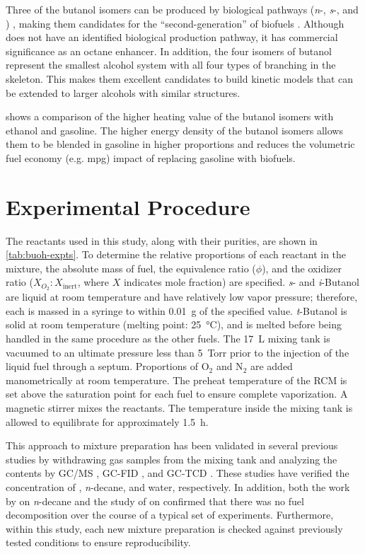 \documentclass[../main.tex]{subfiles}
\begin{document}
Three of the butanol isomers can be produced
by biological pathways (\textit{n}-, \textit{s}-, and \iBuOH{})
\cite{Nigam2011,Smith2010}, making them candidates for the ``second-generation''
of biofuels \cite{Harvey2011,Nigam2011}. Although \tBuOH{} does not have
an identified biological production pathway, it has commercial significance
as an octane enhancer. In addition, the four isomers of butanol represent
the smallest alcohol system with all four types of branching in the skeleton.
This makes them excellent candidates to build kinetic models that can be
extended to larger alcohols with similar structures.

 shows a comparison of the higher heating value of
the butanol isomers with ethanol and gasoline. The higher energy density
of the butanol isomers allows them to be blended in gasoline in higher
proportions and reduces the volumetric fuel economy (e.g. mpg) impact
of replacing gasoline with biofuels.

\section{Experimental Procedure}
\label{sec:buoh-proc}

The reactants used in this study, along with their purities, are shown in
\cref{tab:buoh-expts}. To determine the relative proportions of each
reactant in the mixture, the absolute mass of fuel, the equivalence ratio
($\phi$), and the oxidizer ratio ($X_{O_2}:X_{\mathrm{inert}}$, where $X$
indicates mole fraction) are specified. \textit{s}- and \textit{i}-Butanol are
liquid at room temperature and have relatively low vapor pressure; therefore,
each is massed in a syringe to within \SI{0.01}{g} of the specified
value. \textit{t}-Butanol is solid at room temperature (melting point: \SI{25}{\celsius}),
and is melted before being handled in the same procedure as the other fuels.
The \SI{17}{\liter} mixing tank is vacuumed to an ultimate pressure less than \SI{5}{Torr} prior
to the injection of the liquid fuel through a septum. Proportions of O$_2$ and
N$_2$ are added manometrically at room temperature. The preheat temperature of
the RCM is set above the saturation point for each fuel to ensure complete
vaporization. A magnetic stirrer mixes the reactants. The temperature inside
the mixing tank is allowed to equilibrate for approximately \SI{1.5}{\hour}.

This approach to mixture preparation has been validated in several previous
studies by withdrawing gas samples from the mixing tank and analyzing the
contents by GC/MS \cite{Weber2011}, GC-FID \cite{Kumar2009}, and GC-TCD
\cite{Das2012}. These studies have verified the concentration of
\nBuOH{}, \textit{n}-decane, and water, respectively. In addition,
both the work by \textcite{Kumar2009} on \textit{n}-decane and the study of
\textcite{Weber2011} on \nBuOH{} confirmed that there was no fuel
decomposition over the course of a typical set of experiments. Furthermore,
within this study, each new mixture preparation is checked against previously
tested conditions to ensure reproducibility.
\end{document}
